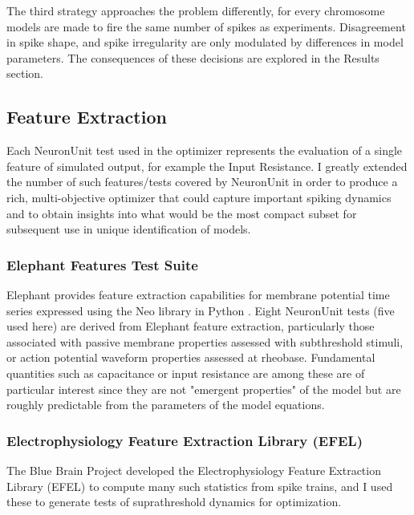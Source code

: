 The third strategy approaches the problem differently, for every chromosome models are made to fire the same number of spikes as experiments. Disagreement in spike shape, and spike irregularity are only modulated by differences in model parameters. The consequences of these decisions are explored in the Results section.

\subsection{Feature Extraction}
Each NeuronUnit test used in the optimizer represents the evaluation of a single feature of simulated output, for example the Input Resistance.
I greatly extended the number of such features/tests covered by NeuronUnit in order to produce a rich, multi-objective optimizer that could capture important spiking dynamics and to obtain insights into what would be the most compact subset for subsequent use in unique identification of models.

\subsubsection{Elephant Features Test Suite}
Elephant \cite{elephant18} provides feature extraction capabilities for membrane potential time series expressed using the Neo library in Python \cite{davison_neo}.
Eight NeuronUnit tests (five used here) are derived from Elephant feature extraction, particularly those associated with passive membrane properties assessed with subthreshold stimuli, or action potential waveform properties assessed at rheobase.
Fundamental quantities such as capacitance or input resistance are among these are of  particular interest since they are not "emergent properties" of the model but are roughly predictable from the parameters of the model equations.

\subsubsection{Electrophysiology Feature Extraction Library (EFEL)}
The Blue Brain Project developed the Electrophysiology Feature Extraction Library (EFEL) to compute many such statistics from spike trains, and I used these to generate tests of suprathreshold dynamics for optimization.

